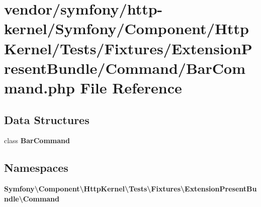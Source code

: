 \section{vendor/symfony/http-\/kernel/\+Symfony/\+Component/\+Http\+Kernel/\+Tests/\+Fixtures/\+Extension\+Present\+Bundle/\+Command/\+Bar\+Command.php File Reference}
\label{_bar_command_8php}
\subsection*{Data Structures}
\begin{DoxyCompactItemize}
\item 
class {\bf Bar\+Command}
\end{DoxyCompactItemize}
\subsection*{Namespaces}
\begin{DoxyCompactItemize}
\item 
 {\bf Symfony\textbackslash{}\+Component\textbackslash{}\+Http\+Kernel\textbackslash{}\+Tests\textbackslash{}\+Fixtures\textbackslash{}\+Extension\+Present\+Bundle\textbackslash{}\+Command}
\end{DoxyCompactItemize}
